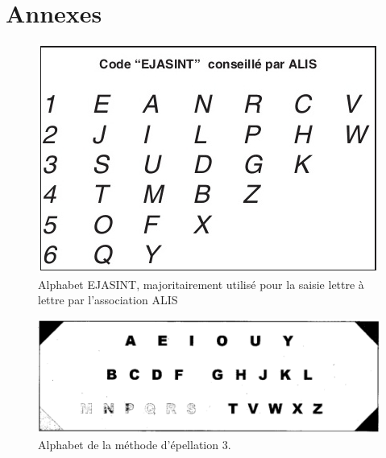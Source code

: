 \documentclass[twoside,twocolumn]{article}
\begin{document}


 
%


\clearpage
\newpage

\section*{Annexes}
\begin{center}
\begin{figure}[h!]
  \includegraphics[scale=0.45]{ejasint.jpg}
  \caption{Alphabet EJASINT, majoritairement utilisé pour la saisie lettre à lettre par l'association ALIS}
  \label{ejasint2}
\end{figure}
\end{center}

\begin{center}
\begin{figure}[h!]
  \includegraphics[scale=0.2]{methode3.png}
  \caption{Alphabet de la méthode d'épellation 3.}
  \label{maxi}
\end{figure}
\end{center}
\end{document}
